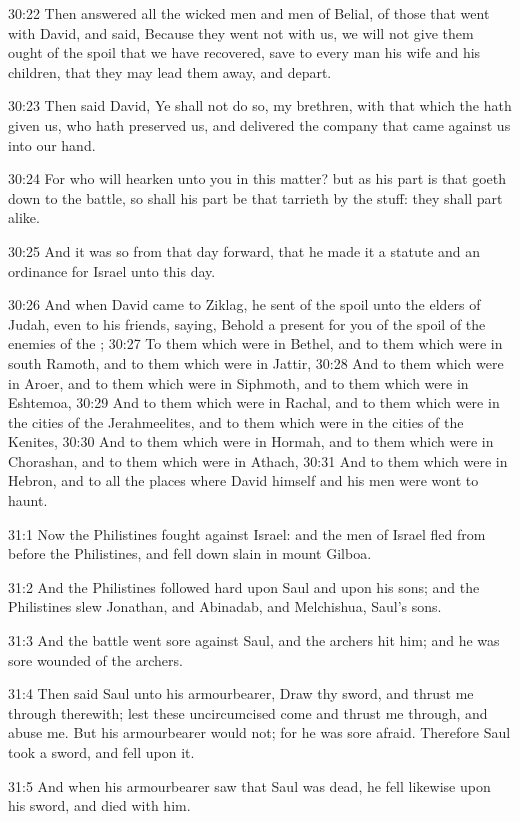 30:22 Then answered all the wicked men and men of Belial, of those that went with David, and said, Because they went not with us, we will not give them ought of the spoil that we have recovered, save to every man his wife and his children, that they may lead them away, and depart.

30:23 Then said David, Ye shall not do so, my brethren, with that which the \LORD hath given us, who hath preserved us, and delivered the company that came against us into our hand.

30:24 For who will hearken unto you in this matter? but as his part is that goeth down to the battle, so shall his part be that tarrieth by the stuff: they shall part alike.

30:25 And it was so from that day forward, that he made it a statute and an ordinance for Israel unto this day.

30:26 And when David came to Ziklag, he sent of the spoil unto the elders of Judah, even to his friends, saying, Behold a present for you of the spoil of the enemies of the \LORD; 30:27 To them which were in Bethel, and to them which were in south Ramoth, and to them which were in Jattir, 30:28 And to them which were in Aroer, and to them which were in Siphmoth, and to them which were in Eshtemoa, 30:29 And to them which were in Rachal, and to them which were in the cities of the Jerahmeelites, and to them which were in the cities of the Kenites, 30:30 And to them which were in Hormah, and to them which were in Chorashan, and to them which were in Athach, 30:31 And to them which were in Hebron, and to all the places where David himself and his men were wont to haunt.

31:1 Now the Philistines fought against Israel: and the men of Israel fled from before the Philistines, and fell down slain in mount Gilboa.

31:2 And the Philistines followed hard upon Saul and upon his sons; and the Philistines slew Jonathan, and Abinadab, and Melchishua, Saul's sons.

31:3 And the battle went sore against Saul, and the archers hit him; and he was sore wounded of the archers.

31:4 Then said Saul unto his armourbearer, Draw thy sword, and thrust me through therewith; lest these uncircumcised come and thrust me through, and abuse me. But his armourbearer would not; for he was sore afraid. Therefore Saul took a sword, and fell upon it.

31:5 And when his armourbearer saw that Saul was dead, he fell likewise upon his sword, and died with him.

